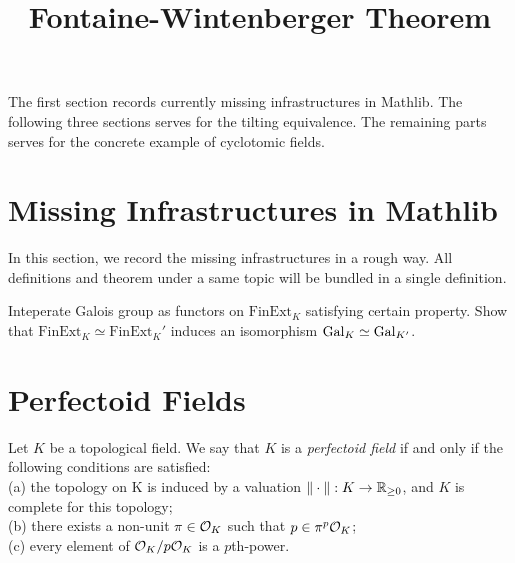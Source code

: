 \title{Fontaine-Wintenberger Theorem}




\maketitle


\tableofcontents

The first section records currently missing infrastructures in Mathlib. The following three sections serves for the tilting equivalence. The remaining parts serves for the concrete example of cyclotomic fields.

\section{Missing Infrastructures in Mathlib}
In this section, we record the missing infrastructures in a rough way. All definitions and theorem under a same topic will be bundled in a single definition.

\begin{definition}
    \label{Relate Galois Group with Category of Finite Field Extensions}
    \notready

    Inteperate Galois group as functors on $ \text{FinExt}_K $ satisfying certain property. Show that $\text{FinExt}_K \simeq \text{FinExt}_K'$ induces an isomorphism $\operatorname{Gal}_K \simeq \operatorname{Gal}_{K'}$.
\end{definition}

\section{Perfectoid Fields}

\begin{definition}
    \label{Perfectoid Field}

    Let $K$ be a topological field. We say that $K$ is a \emph{perfectoid field} if and only if the following conditions are satisfied:\\
    (a) the topology on K is induced by a valuation $\| \cdot \| : K \to \mathbb{R}_{\ge0}$, and $K$ is complete for this topology;\\
    (b) there exists a non-unit $\pi \in \mathcal{O}_K$ such that $p \in \pi^p \mathcal{O}_K$;\\
    (c) every element of $\mathcal{O}_K/p\mathcal{O}_K$ is a $p$th-power.
\end{definition}



